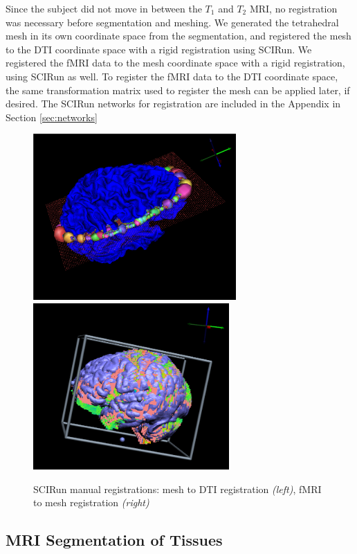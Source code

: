 Since the subject did not move in between the $T_1$ and $T_2$ MRI, no registration was necessary before segmentation and meshing. We generated the tetrahedral mesh in its own coordinate space from the segmentation, and registered the mesh to the DTI coordinate space with a rigid registration using SCIRun. We registered the fMRI data to the mesh coordinate space with a rigid registration, using SCIRun as well. To register the fMRI data to the DTI coordinate space, the same transformation matrix used to register the mesh can be applied later, if desired. The SCIRun networks for registration are included in the Appendix in Section \ref{sec:networks}

\begin{figure}[H]
\begin{center}
\includegraphics[height = 2.5in]{Figures/DTI_reg}
\includegraphics[height = 2.5in]{Figures/fmri_reg}
\caption{SCIRun manual registrations: mesh to DTI registration \textit{(left)}, fMRI to mesh registration \textit{(right)}}
\label{fig:dtireg}
\end{center}
\end{figure}

\subsection{MRI Segmentation of Tissues}
\label{sec:Seg}

